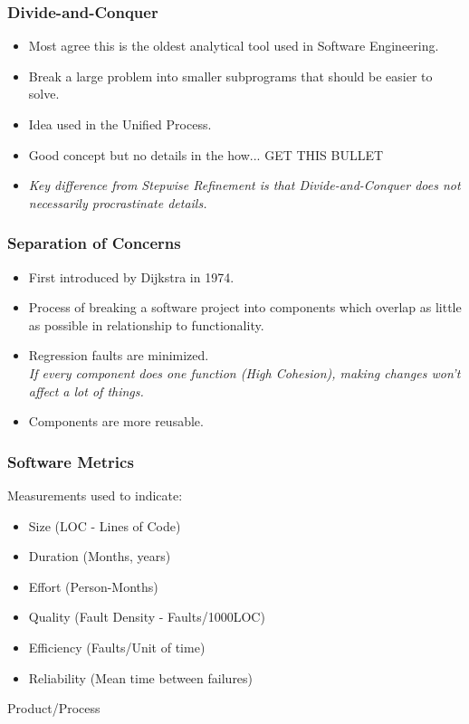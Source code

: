 \documentclass{report}
\begin{document}
				\subsubsection{Divide-and-Conquer}
					\begin{itemize}
						\item Most agree this is the oldest analytical tool used in Software Engineering.
						\item Break a large problem into smaller subprograms that should be easier to solve.
						\item Idea used in the Unified Process.
						\item Good concept but no details in the how... \textsc{GET THIS BULLET}
						\item \textit{Key difference from Stepwise Refinement is that Divide-and-Conquer does not necessarily procrastinate details.}
					\end{itemize}
				\subsubsection{Separation of Concerns}
					\begin{itemize}
						\item First introduced by Dijkstra in 1974.
						\item Process of breaking a software project into components which overlap as little as possible in relationship to functionality.
						\item Regression faults are minimized.\\
							\textit{If every component does one function (High Cohesion), making changes won't affect a lot of things.}
						\item Components are more reusable.
					\end{itemize}
				\subsubsection{Software Metrics}
					Measurements used to indicate:
					\begin{itemize}
						\item Size (LOC - Lines of Code)
						\item Duration (Months, years)
						\item Effort (Person-Months)
						\item Quality (Fault Density - Faults/1000LOC)
						\item Efficiency (Faults/Unit of time)
						\item Reliability (Mean time between failures)
					\end{itemize}
					Product/Process
\end{document}
